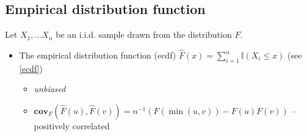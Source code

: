 \documentclass[12pt]{article}
\newcommand{\II}{\mathbb{I}}
\begin{document}
\subsection{Empirical distribution function}
Let $X_1, \ldots X_n$ be an i.i.d. sample drawn from the distribution $F$.
\begin{itemize}
	\item The empirical distribution function (ecdf) $\hat{F}(x) = \sum_{i = 1}^n \II(X_i \leq x)$ (see \ref{ecdf})
	\begin{itemize}
		\item \emph{unbiased}
		\item $\textbf{cov}_F\left(\hat F (u), \hat F (v)\right) = n^{-1}(F(\min(u, v)) - F(u)F(v))$ -- positively correlated
	\end{itemize}
\end{itemize}
\end{document}
